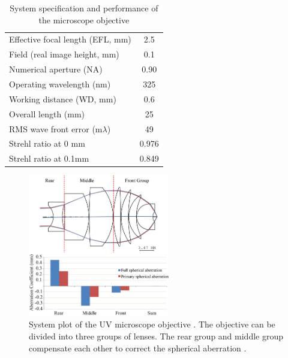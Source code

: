 \setlength{\arrayrulewidth}{.5mm}
\setlength{\tabcolsep}{18pt}
\renewcommand{\arraystretch}{1.2}
\begin{table}[h!]
    \centering
    \captionsetup{justification=centering}
    \caption{System specification and performance of the microscope objective}
    \label{table: vollrathspec}
    \vspace{-1em}
    \begin{tabular}{ p{15em}  c }
    \hline 
    Effective focal length (EFL, mm) & 2.5\\ 
    Field (real image height, mm) & 0.1\\ 
    Numerical aperture (NA) & 0.90\\ 
    Operating wavelength (nm) & 325\\ 
    Working distance (WD, mm) & 0.6\\ 
    Overall length (mm) & 25\\
    \midrule
    RMS wave front error (m$\lambda$) & 49\\ 
    Strehl ratio at 0 mm & 0.976\\ 
    Strehl ratio at 0.1mm & 0.849\\
    \hline
    \end{tabular}
\end{table}

\begin{figure}[h!]
    \centering
    \includegraphics[width=0.55\textwidth]{chapter-4/figures/Vollrath_original.png}
    \caption{System plot of the UV microscope objective \cite{patentvollrath}. The objective can be divided into three groups of lenses. The rear group and middle group compensate each other to correct the spherical aberration \cite{ZhangMicroscope2017}.}
    \label{fig: vollrathoriginal}
\end{figure}

